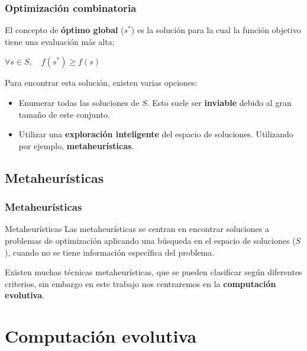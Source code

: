 \documentclass{beamer}
\begin{document}
\begin{frame}
\frametitle{Optimización combinatoria}

El concepto de \textbf{óptimo global} ($s^*$) es la solución para la cual la función objetivo tiene una evaluación más alta:

\begin{center}
    $\forall s \in S, \quad f(s^*) \geq f(s)$ 
\end{center}

Para encontrar esta solución, existen varias opciones:

\begin{itemize}
    \item Enumerar todas las soluciones de $S$. Esto suele ser \textbf{inviable} debido al gran tamaño de este conjunto.
    \item Utilizar una \textbf{exploración inteligente} del espacio de soluciones. Utilizando por ejemplo, \textbf{metaheurísticas}.
\end{itemize}

\end{frame}

\subsection{Metaheurísticas}

\begin{frame}
\frametitle{Metaheurísticas}

\begin{block}{Metaheurísticas}
 Las metaheurísticas se centran en encontrar soluciones a problemas de optimización aplicando una búsqueda en el espacio de soluciones ($S$), cuando no se tiene información específica del problema.
\end{block}

\bigskip

Existen muchas técnicas metaheurísticas, que se pueden clasificar según diferentes criterios, sin embargo en este trabajo nos centraremos en la \textbf{computación evolutiva}.

\end{frame}

\section{Computación evolutiva}
\end{document}
